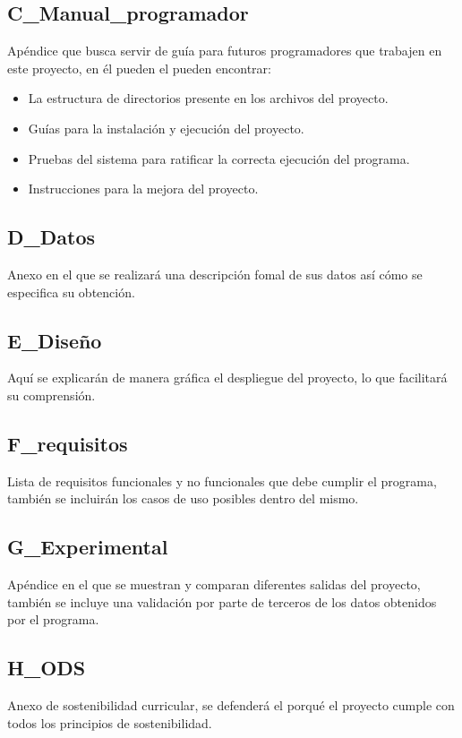 \subsection{C\_Manual\_programador}

Apéndice que busca servir de guía para futuros programadores que trabajen en este proyecto, en él pueden el pueden encontrar:

\begin{itemize}
  \item La estructura de directorios presente en los archivos del proyecto.
  
  \item Guías para la instalación y ejecución del proyecto.

  \item Pruebas del sistema para ratificar la correcta ejecución del programa.
  
  \item Instrucciones para la mejora del proyecto.
    
\end{itemize}

\subsection{D\_Datos}

Anexo en el que se realizará una descripción fomal de sus datos así cómo se especifica su obtención.

\subsection{E\_Diseño}

Aquí se explicarán de manera gráfica el despliegue del proyecto, lo que facilitará su comprensión.

\subsection{F\_requisitos}

Lista de requisitos funcionales y no funcionales que debe cumplir el programa, también se incluirán los casos de uso posibles dentro del mismo.

\subsection{G\_Experimental}

Apéndice en el que se muestran y comparan diferentes salidas del proyecto, también se incluye una validación por parte de terceros de los datos obtenidos por el programa.

\subsection{H\_ODS}

Anexo de sostenibilidad curricular, se defenderá el porqué el proyecto cumple con todos los principios de sostenibilidad.